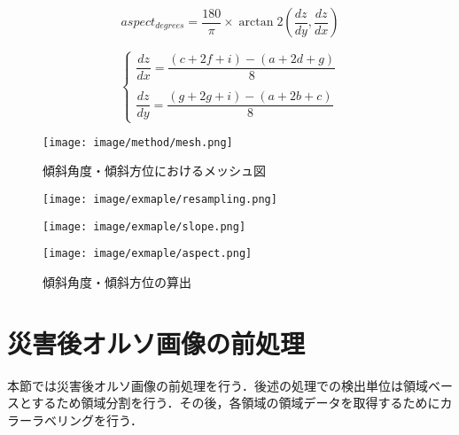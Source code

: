       \begin{equation}
        \label{傾斜方位}
        aspect_{degrees} = 
        \dfrac{180} {\pi} \times
        \arctan 2 (\dfrac{dz}{dy}, \dfrac{dz}{dx})
      \end{equation}

      \begin{equation}
        \label{X方向・Y方向の変化率}
        \left\{
          \begin{array}{l}
            \dfrac{dz}{dx} = 
              \dfrac {(c + 2f + i) - (a + 2d + g)} {8} \\ \\
            \dfrac{dz}{dy} = 
              \dfrac {(g + 2g + i) - (a + 2b + c)} {8}    
          \end{array}
        \right.
      \end{equation}

      \begin{figure}[t]
        \centering
        \texttt{[image: image/method/mesh.png]}
        \caption{傾斜角度・傾斜方位におけるメッシュ図}
        \label{メッシュ図}
      \end{figure}
      
      \begin{figure}[t]
        \begin{minipage}[c]{0.329\hsize}
          \centering
          \texttt{[image: image/exmaple/resampling.png]}
          \label{入力DEM}
        \end{minipage}
        \begin{minipage}[c]{0.329\hsize}
          \centering
          \texttt{[image: image/exmaple/slope.png]}
          \label{傾斜角度モデル}
        \end{minipage}
        \begin{minipage}[c]{0.329\hsize}
          \centering
          \texttt{[image: image/exmaple/aspect.png]}
          \label{傾斜方位モデル}
        \end{minipage}
        \caption{傾斜角度・傾斜方位の算出}
      \end{figure}



  \section{災害後オルソ画像の前処理}
    本節では災害後オルソ画像の前処理を行う．後述の処理での検出単位は領域ベースとするため領域分割を行う．その後，各領域の領域データを取得するためにカラーラベリングを行う．


